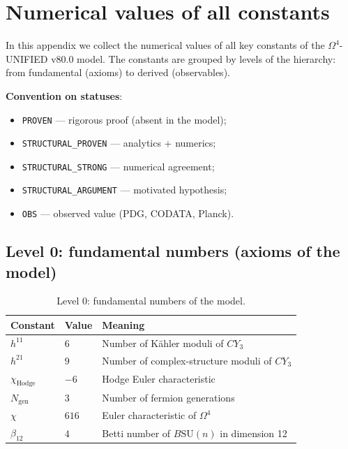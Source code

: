 \documentclass[11pt,a4paper]{article}
\newcommand{\SU}{\ensuremath{\mathrm{SU}}}
\newcommand{\CY}{\ensuremath{CY_3}}
\newcommand{\Om}{\ensuremath{\Omega^4}}
\theoremstyle{definition}
\begin{document}
\appendix

\section{Numerical values of all constants}
\label{app:numbers}

In this appendix we collect the numerical values of all key
constants of the $\Om$-UNIFIED v80.0 model. The constants are grouped
by levels of the hierarchy: from fundamental (axioms) to derived
(observables).

\medskip\noindent
\textbf{Convention on statuses}:
\begin{itemize}
    \item \texttt{PROVEN} --- rigorous proof (absent in the model);
    \item \texttt{STRUCTURAL\_PROVEN} --- analytics + numerics;
    \item \texttt{STRUCTURAL\_STRONG} --- numerical agreement;
    \item \texttt{STRUCTURAL\_ARGUMENT} --- motivated hypothesis;
    \item \texttt{OBS} --- observed value (PDG, CODATA, Planck).
\end{itemize}

\subsection{Level 0: fundamental numbers (axioms of the model)}
\label{app:level-0}

\begin{table}[ht]
\centering
\caption{Level 0: fundamental numbers of the model.}
\label{tab:app-level-0}
\begin{tabular}{lll}
\toprule
Constant & Value & Meaning \\
\midrule
$h^{11}$ & $6$ & Number of K\"ahler moduli of $\CY$ \\
$h^{21}$ & $9$ & Number of complex-structure moduli of $\CY$ \\
$\chi_{\text{Hodge}}$ & $-6$ & Hodge Euler characteristic \\
$N_{\text{gen}}$ & $3$ & Number of fermion generations \\
$\chi$ & $616$ & Euler characteristic of $\Om$ \\
$\beta_{12}$ & $4$ & Betti number of $B\SU(n)$ in dimension 12 \\
\bottomrule
\end{tabular}
\end{table}
\end{document}
